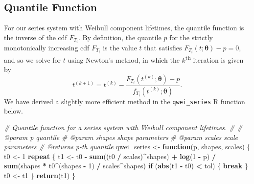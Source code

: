 \documentclass[
]{article}
\newenvironment{Shaded}{\begin{snugshade}}{\end{snugshade}}
\newcommand{\CommentTok}[1]{\textcolor[rgb]{0.56,0.35,0.01}{\textit{#1}}}
\newcommand{\ControlFlowTok}[1]{\textcolor[rgb]{0.13,0.29,0.53}{\textbf{#1}}}
\newcommand{\DecValTok}[1]{\textcolor[rgb]{0.00,0.00,0.81}{#1}}
\newcommand{\KeywordTok}[1]{\textcolor[rgb]{0.13,0.29,0.53}{\textbf{#1}}}
\newcommand{\NormalTok}[1]{#1}
\newcommand{\OperatorTok}[1]{\textcolor[rgb]{0.81,0.36,0.00}{\textbf{#1}}}
\newcommand{\StringTok}[1]{\textcolor[rgb]{0.31,0.60,0.02}{#1}}
\theoremstyle{definition}
\theoremstyle{plain}
\theoremstyle{definition}
\theoremstyle{definition}
\theoremstyle{definition}
\theoremstyle{definition}
\theoremstyle{remark}
\begin{document}
\hypertarget{app-series-quantile}{%
\subsection{Quantile Function}\label{app-series-quantile}}

For our series system with Weibull component lifetimes, the quantile function is
the inverse of the cdf \(F_{T_i}\). By definition, the quantile \(p\) for the strictly
monotonically increasing cdf \(F_{T_i}\) is the value \(t\) that satisfies
\(F_{T_i}(t;\boldsymbol{\theta}) - p = 0\), and so we solve for \(t\) using Newton's method,
in which the \(k\)\textsuperscript{th} iteration is given by
\[
t^{(k+1)} = t^{(k)} - \frac{F_{T_i}(t^{(k)};\boldsymbol{\theta}) - p}{f_{T_i}(t^{(k)};\boldsymbol{\theta})}.
\]
We have derived a slightly more efficient method in the \texttt{qwei\_series} R function
below.

\begin{Shaded}
\begin{Highlighting}[]
\CommentTok{\#\textquotesingle{} Quantile function for a series system with Weibull component lifetimes.}
\CommentTok{\#\textquotesingle{}}
\CommentTok{\#\textquotesingle{} @param p quantile}
\CommentTok{\#\textquotesingle{} @param shapes shape parameters}
\CommentTok{\#\textquotesingle{} @param scales scale parameters}
\CommentTok{\#\textquotesingle{} @returns p{-}th quantile}
\NormalTok{qwei\_series \textless{}{-}}\StringTok{ }\ControlFlowTok{function}\NormalTok{(p, shapes, scales) \{}
\NormalTok{  t0 \textless{}{-}}\StringTok{ }\DecValTok{1}
  \ControlFlowTok{repeat}\NormalTok{ \{}
\NormalTok{    t1 \textless{}{-}}\StringTok{ }\NormalTok{t0 }\OperatorTok{{-}}\StringTok{ }\KeywordTok{sum}\NormalTok{((t0 }\OperatorTok{/}\StringTok{ }\NormalTok{scales)}\OperatorTok{\^{}}\NormalTok{shapes) }\OperatorTok{+}\StringTok{ }\KeywordTok{log}\NormalTok{(}\DecValTok{1} \OperatorTok{{-}}\StringTok{ }\NormalTok{p) }\OperatorTok{/}
\StringTok{      }\KeywordTok{sum}\NormalTok{(shapes }\OperatorTok{*}\StringTok{ }\NormalTok{t0}\OperatorTok{\^{}}\NormalTok{(shapes }\OperatorTok{{-}}\StringTok{ }\DecValTok{1}\NormalTok{) }\OperatorTok{/}\StringTok{ }\NormalTok{scales}\OperatorTok{\^{}}\NormalTok{shapes)}
    \ControlFlowTok{if}\NormalTok{ (}\KeywordTok{abs}\NormalTok{(t1 }\OperatorTok{{-}}\StringTok{ }\NormalTok{t0) }\OperatorTok{\textless{}}\StringTok{ }\NormalTok{tol) \{}
      \ControlFlowTok{break}
\NormalTok{    \}}
\NormalTok{    t0 \textless{}{-}}\StringTok{ }\NormalTok{t1}
\NormalTok{  \}}
  \KeywordTok{return}\NormalTok{(t1)}
\NormalTok{\}}
\end{Highlighting}
\end{Shaded}
\end{document}
